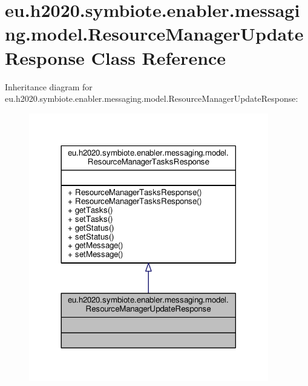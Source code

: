\hypertarget{classeu_1_1h2020_1_1symbiote_1_1enabler_1_1messaging_1_1model_1_1ResourceManagerUpdateResponse}{}\section{eu.\+h2020.\+symbiote.\+enabler.\+messaging.\+model.\+Resource\+Manager\+Update\+Response Class Reference}
\label{classeu_1_1h2020_1_1symbiote_1_1enabler_1_1messaging_1_1model_1_1ResourceManagerUpdateResponse}


Inheritance diagram for eu.\+h2020.\+symbiote.\+enabler.\+messaging.\+model.\+Resource\+Manager\+Update\+Response\+:\nopagebreak
\begin{figure}[H]
\begin{center}
\leavevmode
\includegraphics[width=296pt]{classeu_1_1h2020_1_1symbiote_1_1enabler_1_1messaging_1_1model_1_1ResourceManagerUpdateResponse__inherit__graph}
\end{center}
\end{figure}


